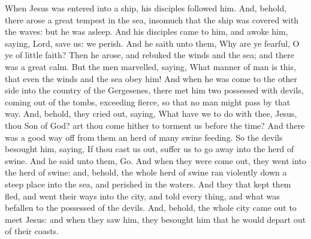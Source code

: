  When Jesus was entered into a ship, his disciples followed him. And, behold, there arose a great tempest in the sea, insomuch that the ship was covered with the waves: but he was asleep. And his disciples came to him, and awoke him, saying, Lord, save us: we perish. And he saith unto them, Why are ye fearful, O ye of little faith? Then he arose, and rebuked the winds and the sea; and there was a great calm. But the men marvelled, saying, What manner of man is this, that even the winds and the sea obey him! And when he was come to the other side into the country of the Gergesenes, there met him two possessed with devils, coming out of the tombs, exceeding fierce, so that no man might pass by that way. And, behold, they cried out, saying, What have we to do with thee, Jesus, thou Son of God? art thou come hither to torment us before the time? And there was a good way off from them an herd of many swine feeding. So the devils besought him, saying, If thou cast us out, suffer us to go away into the herd of swine. And he said unto them, Go. And when they were come out, they went into the herd of swine: and, behold, the whole herd of swine ran violently down a steep place into the sea, and perished in the waters. And they that kept them fled, and went their ways into the city, and told every thing, and what was befallen to the possessed of the devils. And, behold, the whole city came out to meet Jesus: and when they saw him, they besought him that he would depart out of their coasts.


\clearpage

